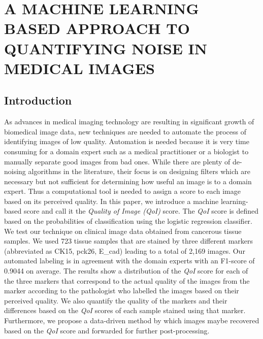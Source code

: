 \chapter{A MACHINE LEARNING BASED APPROACH TO QUANTIFYING NOISE IN MEDICAL IMAGES}
\label{chap:SPIE1}

\let\thefootnote\relax{}

\section{Introduction}

As advances in medical imaging technology are resulting in significant growth of biomedical image data, new techniques are needed to automate the process of identifying images of low quality. Automation is needed because it is very time consuming for a domain expert such as a medical practitioner or a biologist to manually separate good images from bad ones. While there are plenty of de-noising algorithms in the literature, their focus is on designing filters which are necessary but not sufficient for determining how useful an image is to a domain expert.
Thus a computational tool is needed to assign a score to each image based on its perceived quality. In this paper, we introduce a machine learning-based score and call it the \textit{Quality of Image (QoI)} score. The \textit{QoI} score is defined based on the probabilities of classification using the logistic regression classifier.
We test our technique on clinical image data obtained from cancerous tissue samples. We used 723 tissue samples that are stained by three different markers (abbreviated as CK15, pck26, E\_cad) leading to a total of 2,169 images. Our automated labeling is in agreement with the domain experts with an F1-score of 0.9044 on average. The results show a distribution of the \textit{QoI} score for each of the three markers that correspond to the actual quality of the images from the marker according to the pathologist who labelled the images based on their perceived quality.  We also quantify the quality of the markers and their differences based on the \textit{QoI} scores of each sample stained using that marker. 
Furthermore, we propose a data-driven method by which images maybe recovered based on the \textit{QoI} score and forwarded for further post-processing.

